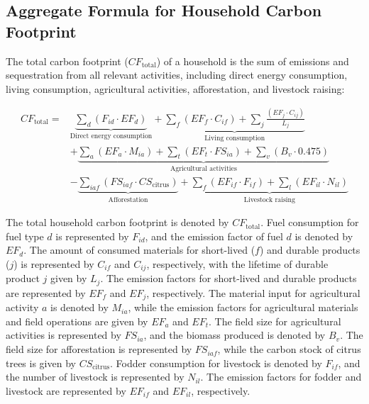 \documentclass[12pt,a4paper]{article}%
\begin{document}
\subsection{Aggregate Formula for Household Carbon Footprint}

The total carbon footprint ($CF_{\text{total}}$) of a household is the sum of emissions and sequestration from all relevant activities, including direct energy consumption, living consumption, agricultural activities, afforestation, and livestock raising:

\begin{align}
CF_{\text{total}} = & \underbrace{\sum_d \left(F_{id} \cdot EF_d\right)}_{\text{Direct energy consumption}} + 
\underbrace{\sum_f \left(EF_f \cdot C_{if}\right) + \sum_j \frac{\left(EF_j \cdot C_{ij}\right)}{L_j}}_{\text{Living consumption}} \nonumber \\
& + \underbrace{\sum_a \left(EF_a \cdot M_{ia}\right) + \sum_t \left(EF_t \cdot FS_{ia}\right) + \sum_v \left(B_v \cdot 0.475\right)}_{\text{Agricultural activities}} \nonumber \\
& - \underbrace{\sum_{iaf} \left(FS_{iaf} \cdot CS_{\text{citrus}}\right)}_{\text{Afforestation}} +
\underbrace{\sum_f \left(EF_{if} \cdot F_{if}\right) + \sum_l \left(EF_{il} \cdot N_{il}\right)}_{\text{Livestock raising}}
\end{align}


The total household carbon footprint is denoted by $CF_{\text{total}}$. Fuel consumption for fuel type $d$ is represented by $F_{id}$, and the emission factor of fuel $d$ is denoted by $EF_d$. The amount of consumed materials for short-lived ($f$) and durable products ($j$) is represented by $C_{if}$ and $C_{ij}$, respectively, with the lifetime of durable product $j$ given by $L_j$. The emission factors for short-lived and durable products are represented by $EF_f$ and $EF_j$, respectively. The material input for agricultural activity $a$ is denoted by $M_{ia}$, while the emission factors for agricultural materials and field operations are given by $EF_a$ and $EF_t$. The field size for agricultural activities is represented by $FS_{ia}$, and the biomass produced is denoted by $B_v$. The field size for afforestation is represented by $FS_{iaf}$, while the carbon stock of citrus trees is given by $CS_{\text{citrus}}$. Fodder consumption for livestock is denoted by $F_{if}$, and the number of livestock is represented by $N_{il}$. The emission factors for fodder and livestock are represented by $EF_{if}$ and $EF_{il}$, respectively.
\end{document}

